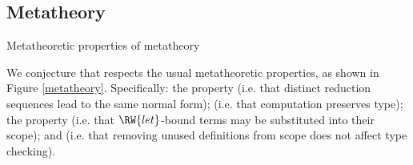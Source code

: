 \subsection{Metatheory}

{Metatheoretic properties of \TT{}}
{metatheory}

We conjecture that \TT{} respects the usual metatheoretic properties, as shown in
Figure \ref{metatheory}.  Specifically: the  property
(i.e. that distinct reduction sequences lead to the same normal form);
 (i.e. that computation preserves type); the
 property (i.e. that $\RW{let}$-bound terms may be substituted into
their scope); and  (i.e. that removing unused definitions
from scope does not affect type checking).

